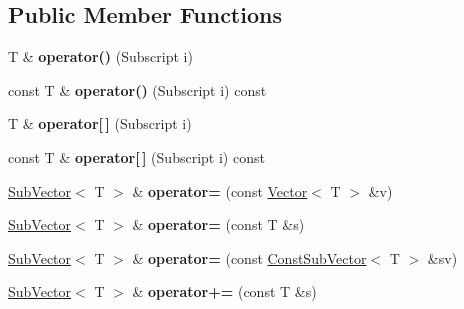 \subsection*{Public Member Functions}
\begin{DoxyCompactItemize}
\item 
\mbox{\label{classTLAS_1_1SubVector_a978e074e59634cc21aa66a67c0cbe9e5}} 
T \& {\bfseries operator()} (Subscript i)
\item 
\mbox{\label{classTLAS_1_1SubVector_a6d5ed2518abcc3514ee4df6fc7928ce1}} 
const T \& {\bfseries operator()} (Subscript i) const
\item 
\mbox{\label{classTLAS_1_1SubVector_a6024fd785f6994587898b11218b741f9}} 
T \& {\bfseries operator\mbox{[}$\,$\mbox{]}} (Subscript i)
\item 
\mbox{\label{classTLAS_1_1SubVector_aec0f645c4232b243871cd1bc70998de2}} 
const T \& {\bfseries operator\mbox{[}$\,$\mbox{]}} (Subscript i) const
\item 
\mbox{\label{classTLAS_1_1SubVector_ab3f56e6afbbe0e3e27cfc283dc42ccb0}} 
\hyperlink{classTLAS_1_1SubVector}{Sub\+Vector}$<$ T $>$ \& {\bfseries operator=} (const \hyperlink{classTLAS_1_1Vector}{Vector}$<$ T $>$ \&v)
\item 
\mbox{\label{classTLAS_1_1SubVector_a098b08a06f05ebf725a0773d38d78c46}} 
\hyperlink{classTLAS_1_1SubVector}{Sub\+Vector}$<$ T $>$ \& {\bfseries operator=} (const T \&s)
\item 
\mbox{\label{classTLAS_1_1SubVector_a46500e14e723ef02b10435edc501bd2d}} 
\hyperlink{classTLAS_1_1SubVector}{Sub\+Vector}$<$ T $>$ \& {\bfseries operator=} (const \hyperlink{classTLAS_1_1ConstSubVector}{Const\+Sub\+Vector}$<$ T $>$ \&sv)
\item 
\mbox{\label{classTLAS_1_1SubVector_af53a43d8f3d8e9f114317a8c4bd319f5}} 
\hyperlink{classTLAS_1_1SubVector}{Sub\+Vector}$<$ T $>$ \& {\bfseries operator+=} (const T \&s)
\item 
\mbox{\label{classTLAS_1_1SubVector_a48adca449dd2977ca724866923b4cb9c}} 

\end{DoxyCompactItemize}
